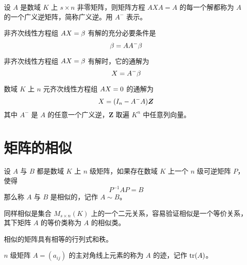 \begin{definition}
    设 $A$ 是数域 $K$ 上 $s\times n$ 非零矩阵，则矩阵方程 $AXA = A$ 的每一个解都称为 $A$ 的一个广义逆矩阵，简称广义逆。用 $A^-$ 表示。
\end{definition}

\begin{theorem}
    非齐次线性方程组 $AX = \beta$ 有解的充分必要条件是
    \[\beta = AA^-\beta\]
\end{theorem}

\begin{theorem}
    非齐次线性方程组 $AX = \beta$ 有解时，它的通解为
    \[X  = A^-\beta\]
\end{theorem}

\begin{theorem}
    数域 $K$ 上 $n$ 元齐次线性方程组 $AX = 0$ 的通解为
    \[X  = (I_n - A^-A)\boldsymbol{Z}\]
    其中 $A^-$ 是 $A$ 的任意一个广义逆，$\boldsymbol{Z}$ 取遍 $K^n$ 中任意列向量。
\end{theorem}


\section{矩阵的相似}

\begin{definition}
    设 $A$ 与 $B$ 都是数域 $K$ 上 $n$ 级矩阵，如果存在数域 $K$ 上一个 $n$ 级可逆矩阵 $P$，使得
    \[P^{-1}AP = B\]
    那么称 $A$ 与 $B$ 是相似的，记作 $A\sim B$。
\end{definition}

同样相似是集合 $M_{s\times n}(K)$ 上的一个二元关系，容易验证相似是一个等价关系，其下矩阵 $A$ 的等价类称为 $A$ 的相似类。

相似的矩阵具有相等的行列式和秩。

\begin{definition}
    $n$ 级矩阵 $A=(a_{ij})$ 的主对角线上元素的称为 $A$ 的迹，记作 $\operatorname{tr}(A)$。
\end{definition}

